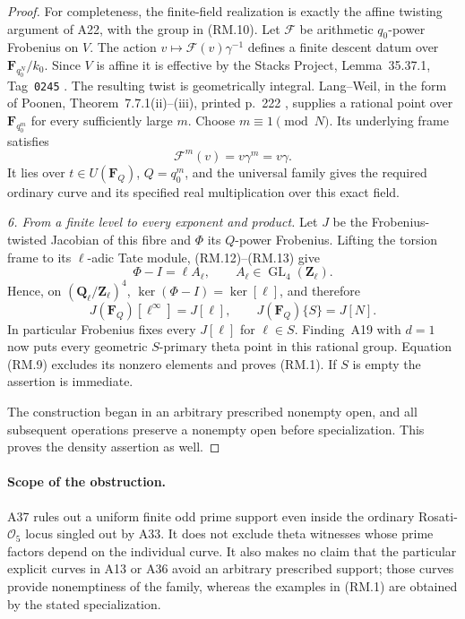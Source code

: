 \documentclass[11pt,a4paper]{article}
\begin{document}
\begin{proof}
For completeness, the finite-field realization is exactly the
affine twisting argument of A22, with the group in (RM.10).
Let $\mathcal F$ be arithmetic $q_0$-power Frobenius on $V$.
The action $v\mapsto\mathcal F(v)\gamma^{-1}$ defines a
finite descent datum over $\mathbf F_{q_0^N}/k_0$.
Since $V$ is affine it is effective by the Stacks Project,
Lemma~35.37.1, Tag~\texttt{0245} \cite{Stacks0245}.
The resulting twist is geometrically integral.  Lang--Weil,
in the form of Poonen, Theorem~7.7.1(ii)--(iii), printed
p.~222 \cite{Poonen2017RPV}, supplies a rational point over
$\mathbf F_{q_0^m}$ for every sufficiently large $m$.
Choose $m\equiv1\pmod N$.  Its underlying frame satisfies
\[
              \mathcal F^m(v)=v\gamma^m=v\gamma.               \tag{RM.13}
\]
It lies over $t\in U(\mathbf F_Q)$, $Q=q_0^m$, and the
universal family gives the required ordinary curve and
its specified real multiplication over this exact field.

\emph{6. From a finite level to every exponent and product.}
Let $J$ be the Frobenius-twisted Jacobian of this fibre and
$\Phi$ its $Q$-power Frobenius.  Lifting the torsion frame
to its $\ell$-adic Tate module, (RM.12)--(RM.13) give
\[
             \Phi-I=\ell A_\ell,
             \qquad A_\ell\in\operatorname{GL}_4(\mathbf Z_\ell).
                                                               \tag{RM.14}
\]
Hence, on $(\mathbf Q_\ell/\mathbf Z_\ell)^4$,
$\ker(\Phi-I)=\ker[\ell]$, and therefore
\[
 J(\mathbf F_Q)[\ell^\infty]=J[\ell],\qquad
                       J(\mathbf F_Q)\{S\}=J[N].              \tag{RM.15}
\]
In particular Frobenius fixes every $J[\ell]$ for
$\ell\in S$.  Finding~A19 with $d=1$ now puts every
geometric $S$-primary theta point in this rational group.
Equation (RM.9) excludes its nonzero elements and proves
(RM.1).  If $S$ is empty the assertion is immediate.

The construction began in an arbitrary prescribed nonempty
open, and all subsequent operations preserve a nonempty
open before specialization.  This proves the density
assertion as well.
\end{proof}

\paragraph{Scope of the obstruction.}
A37 rules out a uniform finite odd prime support even inside
the ordinary Rosati-$\mathcal O_5$ locus singled out by A33.
It does not exclude theta witnesses whose prime factors
depend on the individual curve.  It also makes no claim
that the particular explicit curves in A13 or A36 avoid
an arbitrary prescribed support; those curves provide
nonemptiness of the family, whereas the examples in
(RM.1) are obtained by the stated specialization.
\end{document}
